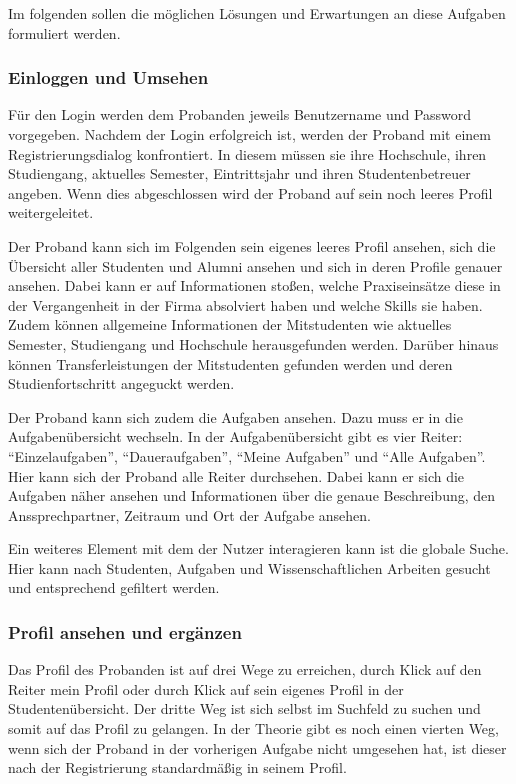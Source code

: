 \documentclass[
  12pt,
  ngerman,
  a4paper,
]{article}
\begin{document}
Im folgenden sollen die möglichen Lösungen und Erwartungen an diese
Aufgaben formuliert werden.

\hypertarget{einloggen-und-umsehen}{%
\subsubsection{Einloggen und Umsehen}\label{einloggen-und-umsehen}}

Für den Login werden dem Probanden jeweils Benutzername und Password
vorgegeben. Nachdem der Login erfolgreich ist, werden der Proband mit
einem Registrierungsdialog konfrontiert. In diesem müssen sie ihre
Hochschule, ihren Studiengang, aktuelles Semester, Eintrittsjahr und
ihren Studentenbetreuer angeben. Wenn dies abgeschlossen wird der
Proband auf sein noch leeres Profil weitergeleitet.

Der Proband kann sich im Folgenden sein eigenes leeres Profil ansehen,
sich die Übersicht aller Studenten und Alumni ansehen und sich in deren
Profile genauer ansehen. Dabei kann er auf Informationen stoßen, welche
Praxiseinsätze diese in der Vergangenheit in der Firma absolviert haben
und welche Skills sie haben. Zudem können allgemeine Informationen der
Mitstudenten wie aktuelles Semester, Studiengang und Hochschule
herausgefunden werden. Darüber hinaus können Transferleistungen der
Mitstudenten gefunden werden und deren Studienfortschritt angeguckt
werden.

Der Proband kann sich zudem die Aufgaben ansehen. Dazu muss er in die
Aufgabenübersicht wechseln. In der Aufgabenübersicht gibt es vier
Reiter: ``Einzelaufgaben'', ``Daueraufgaben'', ``Meine Aufgaben'' und
``Alle Aufgaben''. Hier kann sich der Proband alle Reiter durchsehen.
Dabei kann er sich die Aufgaben näher ansehen und Informationen über die
genaue Beschreibung, den Anssprechpartner, Zeitraum und Ort der Aufgabe
ansehen.

Ein weiteres Element mit dem der Nutzer interagieren kann ist die
globale Suche. Hier kann nach Studenten, Aufgaben und Wissenschaftlichen
Arbeiten gesucht und entsprechend gefiltert werden.

\hypertarget{profil-ansehen-und-erguxe4nzen}{%
\subsubsection{Profil ansehen und
ergänzen}\label{profil-ansehen-und-erguxe4nzen}}

Das Profil des Probanden ist auf drei Wege zu erreichen, durch Klick auf
den Reiter mein Profil oder durch Klick auf sein eigenes Profil in der
Studentenübersicht. Der dritte Weg ist sich selbst im Suchfeld zu suchen
und somit auf das Profil zu gelangen. In der Theorie gibt es noch einen
vierten Weg, wenn sich der Proband in der vorherigen Aufgabe nicht
umgesehen hat, ist dieser nach der Registrierung standardmäßig in seinem
Profil.
\end{document}
